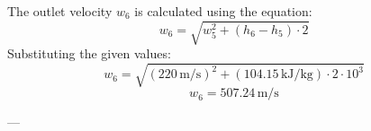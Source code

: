 The outlet velocity \( w_6 \) is calculated using the equation:  
\[
w_6 = \sqrt{w_5^2 + (h_6 - h_5) \cdot 2}
\]  
Substituting the given values:  
\[
w_6 = \sqrt{(220 \, \text{m/s})^2 + (104.15 \, \text{kJ/kg}) \cdot 2 \cdot 10^3}
\]  
\[
w_6 = 507.24 \, \text{m/s}
\]  

---